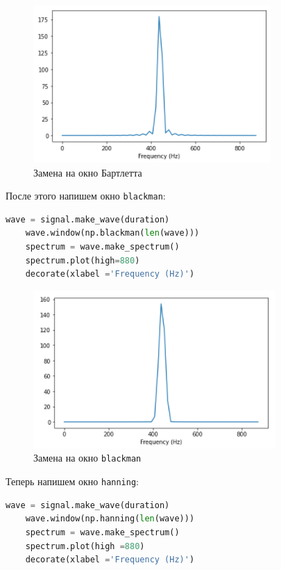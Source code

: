 \documentclass[a4paper]{article}
\begin{document}
            \begin{figure}[H]
                \centering
                \includegraphics{ex_1_bartlett.png}
                \caption{Замена на окно Бартлетта}
                \label{fig:ex_1_bartlett}
            \end{figure}
            
            После этого напишем окно \texttt{blackman}:
            
\begin{lstlisting}[language=Python, caption= Окно \texttt{blackman}]
    wave = signal.make_wave(duration)
    wave.window(np.blackman(len(wave)))
    spectrum = wave.make_spectrum()
    spectrum.plot(high=880)
    decorate(xlabel ='Frequency (Hz)')
\end{lstlisting}               
            
            \begin{figure}[H]
                \centering
                \includegraphics{ex_1_blackman.png}
                \caption{Замена на окно \texttt{blackman}}
                \label{fig:ex_1_blackman}
            \end{figure}
            
            Теперь напишем окно \texttt{hanning}:
            
\begin{lstlisting}[language=Python, caption= Окно \texttt{hanning}]
    wave = signal.make_wave(duration)
    wave.window(np.hanning(len(wave)))
    spectrum = wave.make_spectrum()
    spectrum.plot(high =880)
    decorate(xlabel ='Frequency (Hz)')
\end{lstlisting}               
            
\end{document}
